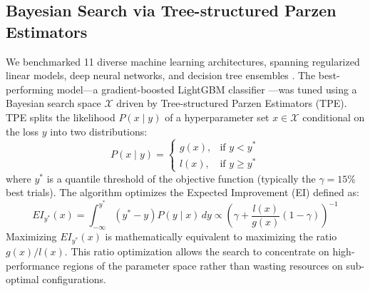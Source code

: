 \documentclass[11pt]{article}
\begin{document}
\subsection{Bayesian Search via Tree-structured Parzen Estimators}
We benchmarked 11 diverse machine learning architectures, spanning regularized linear models, deep neural networks, and decision tree ensembles \citep{breiman2001random, friedman2001greedy}. The best-performing model—a gradient-boosted LightGBM classifier \citep{ke2017lightgbm}—was tuned using a Bayesian search space $\mathcal{X}$ driven by Tree-structured Parzen Estimators (TPE). TPE splits the likelihood $P(x \mid y)$ of a hyperparameter set $x \in \mathcal{X}$ conditional on the loss $y$ into two distributions:
\begin{equation}
P(x \mid y) = \begin{cases} 
g(x), & \text{if } y < y^* \\ 
l(x), & \text{if } y \geq y^* 
\end{cases}
\end{equation}
where $y^*$ is a quantile threshold of the objective function (typically the $\gamma = 15\%$ best trials). The algorithm optimizes the Expected Improvement (EI) defined as:
\begin{equation}
EI_{y^*}(x) = \int_{-\infty}^{y^*} (y^* - y) P(y \mid x) \, dy \propto \left( \gamma + \frac{l(x)}{g(x)} (1 - \gamma) \right)^{-1}
\end{equation}
Maximizing $EI_{y^*}(x)$ is mathematically equivalent to maximizing the ratio $g(x) / l(x)$. This ratio optimization allows the search to concentrate on high-performance regions of the parameter space rather than wasting resources on sub-optimal configurations.
\end{document}

